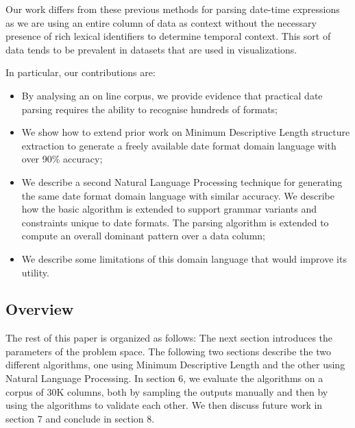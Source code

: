 Our work differs from these previous methods for parsing date-time expressions as we are using an entire column of data as context without the necessary presence of rich lexical identifiers to determine temporal context. This sort of data tends to be prevalent in datasets that are used in visualizations. 

In particular, our contributions are:
\begin{itemize}
\item By analysing an on line corpus, we provide evidence that practical date parsing requires the ability to recognise hundreds of formats;
\item We show how to extend prior work on Minimum Descriptive Length structure extraction to generate a freely available date format domain language with over 90\% accuracy;
\item We describe a second Natural Language Processing technique for generating the same date format domain language with similar accuracy. We describe how the basic algorithm is extended to support grammar variants and constraints unique to date formats. The parsing algorithm is extended to compute an overall dominant pattern over a data column;
\item We describe some limitations of this domain language that would improve its utility.
\end{itemize}


\subsection{Overview}
The rest of this paper is organized as follows: The next section introduces the parameters of the problem space. The following two sections describe the two different algorithms, one using Minimum Descriptive Length and the other using Natural Language Processing. In section 6, we evaluate the algorithms on a corpus of 30K columns, both by sampling the outputs manually and then by using the algorithms to validate each other. We then discuss future work in section 7 and conclude in section 8.
